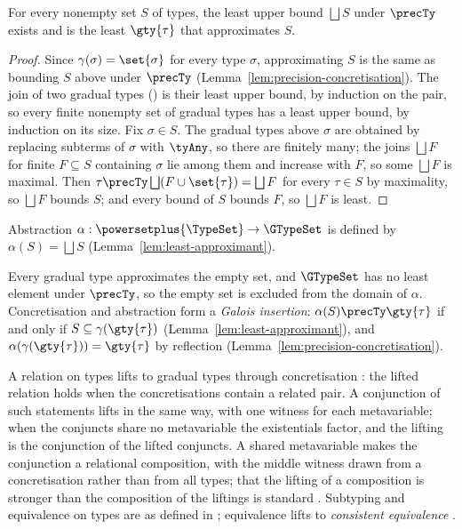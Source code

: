 \begin{lemma}
\label{lem:least-approximant}
For every nonempty set $S$ of types, the least upper bound $\bigsqcup S$ under $\precTy$ exists and
is the least $\gty{\tau}$ that approximates $S$.
\end{lemma}

\begin{proof}
Since $\gamma(\sigma) = \set{\sigma}$ for every type $\sigma$, approximating $S$ is the same as
bounding $S$ above under $\precTy$ (Lemma~\ref{lem:precision-concretisation}). The join of two
gradual types () is their least upper bound, by induction on the pair, so
every finite nonempty set of gradual types has a least upper bound, by induction on its size. Fix
$\sigma \in S$. The gradual types above $\sigma$ are obtained by replacing subterms of $\sigma$ with
$\tyAny$, so there are finitely many; the joins $\bigsqcup F$ for finite $F \subseteq S$ containing
$\sigma$ lie among them and increase with $F$, so some $\bigsqcup F$ is maximal. Then
$\tau \precTy \bigsqcup (F \cup \set{\tau}) = \bigsqcup F$ for every $\tau \in S$ by maximality, so
$\bigsqcup F$ bounds $S$; and every bound of $S$ bounds $F$, so $\bigsqcup F$ is least.
\end{proof}



\begin{definition}[Abstraction]
\label{def:abstraction}
Abstraction $\alpha : \powersetplus{\TypeSet} \to \GTypeSet$ is defined by
$\alpha(S) = \bigsqcup S$ (Lemma~\ref{lem:least-approximant}).
\end{definition}

\noindent Every gradual type approximates the empty set, and $\GTypeSet$ has no least element under
$\precTy$, so the empty set is excluded from the domain of $\alpha$. Concretisation and abstraction
form a \emph{Galois insertion}: $\alpha(S) \precTy \gty{\tau}$ if and only if
$S \subseteq \gamma(\gty{\tau})$ (Lemma~\ref{lem:least-approximant}), and
$\alpha(\gamma(\gty{\tau})) = \gty{\tau}$ by reflection
(Lemma~\ref{lem:precision-concretisation}).

A relation on types lifts to gradual types through concretisation \citep{garcia2016}: the lifted
relation holds when the concretisations contain a related pair. A conjunction of such statements
lifts in the same way, with one witness for each metavariable; when the conjuncts share no
metavariable the existentials factor, and the lifting is the conjunction of the lifted conjuncts.
A shared metavariable makes the conjunction a relational composition, with the middle witness
drawn from a concretisation rather than from all types; that the lifting of a composition is
stronger than the composition of the liftings is standard \citep{garcia2016}. Subtyping and
equivalence on types are as defined in \specification; equivalence lifts to \emph{consistent
equivalence} \citep{sekiyama2019}.

